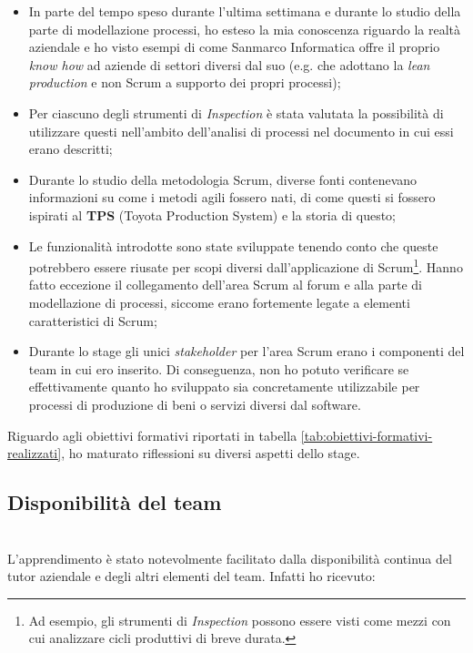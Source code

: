\begin{itemize}
\item In parte del tempo speso durante l'ultima settimana e durante lo studio
  della parte di modellazione processi, ho esteso la mia conoscenza riguardo
  la realtà aziendale e ho visto esempi di come Sanmarco Informatica offre il
  proprio \emph{know how} ad aziende di settori diversi dal suo (e.g. che
  adottano la \emph{lean production} e non Scrum a supporto dei propri
  processi);
\item Per ciascuno degli strumenti di \emph{Inspection} è stata valutata la
  possibilità di utilizzare questi nell'ambito dell'analisi di processi nel
  documento in cui essi erano descritti;
\item Durante lo studio della metodologia Scrum, diverse fonti contenevano
  informazioni su come i metodi agili fossero nati, di come questi si fossero
  ispirati al \textbf{TPS} (Toyota Production System) e la storia di questo;
\item Le funzionalità introdotte sono state sviluppate tenendo conto
  che queste potrebbero essere riusate per scopi diversi dall'applicazione di
  Scrum\footnote{Ad esempio, gli strumenti di \emph{Inspection} possono essere
  visti come mezzi con cui analizzare cicli produttivi di breve durata.}. Hanno
  fatto eccezione il collegamento dell'area Scrum al forum e alla parte di
  modellazione di processi, siccome erano fortemente legate a elementi
  caratteristici di Scrum;
\item Durante lo stage gli unici \emph{stakeholder} per l'area Scrum erano i
  componenti del team in cui ero inserito. Di conseguenza, non ho potuto
  verificare se effettivamente quanto ho sviluppato sia concretamente
  utilizzabile per processi di produzione di beni o servizi diversi dal
  software.
\end{itemize}

Riguardo agli obiettivi formativi riportati in tabella
\ref{tab:obiettivi-formativi-realizzati}, ho maturato riflessioni su diversi
aspetti dello stage.

\subsection{Disponibilità del team} \mbox{} \\

L'apprendimento è stato notevolmente facilitato dalla disponibilità continua
del tutor aziendale e degli altri elementi del team. Infatti ho ricevuto:


